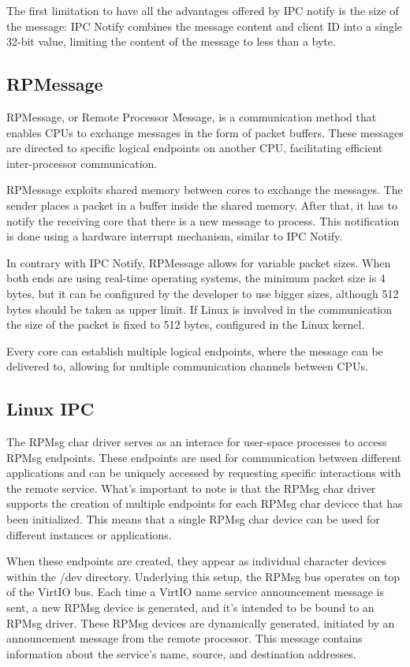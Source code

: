 The first limitation to have all the advantages offered by IPC notify is the
size of the message: IPC Notify combines the message content and client ID into
a single 32-bit value, limiting the content of the message to less than a byte.

\subsection{RPMessage}

RPMessage, or Remote Processor Message, is a communication method that enables
CPUs to exchange messages in the form of packet buffers. These messages are
directed to specific logical endpoints on another CPU, facilitating efficient
inter-processor communication.

RPMessage exploits shared memory between cores to exchange the messages.
The sender places a packet in a buffer inside the shared memory. After that,
it has to notify the receiving core that there is a new message to process.
This notification is done using a hardware interrupt mechanism, similar to
IPC Notify.

In contrary with IPC Notify, RPMessage allows for variable packet sizes.
When both ends are using real-time operating systems, the minimum packet size
is 4 bytes, but it can be configured by the developer to use bigger sizes,
although 512 bytes should be taken as upper limit.
If Linux is involved in the communication the size of the packet is fixed to
512 bytes, configured in the Linux kernel.

Every core can establish multiple logical endpoints, where the message can be
delivered to, allowing for multiple communication channels between CPUs.

\subsection{Linux IPC}

The RPMsg char driver serves as an interace for user-space processes to
access RPMsg endpoints. These endpoints are used for communication between
different applications and can be uniquely accessed by requesting specific
interactions with the remote service. What's important to note is that the
RPMsg char driver supports the creation of multiple endpoints for each RPMsg
char devicce that has been initialized. This means that a single RPMsg char
device can be used for different instances or applications.

When these endpoints are created, they appear as individual character devices
within the /dev directory. Underlying this setup, the RPMsg bus operates on top
of the VirtIO bus. Each time a VirtIO name service announcement message is
sent, a new RPMsg device is generated, and it's intended to be bound to an
RPMsg driver. These RPMsg devices are dynamically generated, initiated by an
announcement message from the remote processor. This message contains
information about the service's name, source, and destination addresses.

